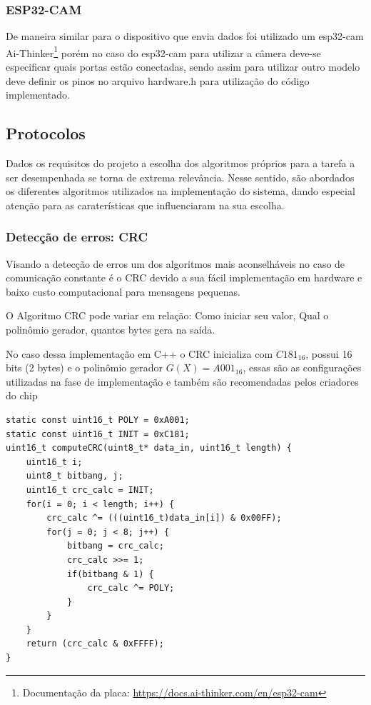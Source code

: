 \documentclass[
article,			%
12pt,				%
oneside,			%
a4paper,			%
english,			%
brazil,				%
sumario=tradicional
]{abntex2}
\begin{document}
\subsubsection{ESP32-CAM}\label{ESP32-CAM}
De maneira similar para o dispositivo que envia dados foi utilizado um esp32-cam Ai-Thinker\footnote{Documentação da placa: \url{https://docs.ai-thinker.com/en/esp32-cam}} porém no caso do esp32-cam para utilizar a câmera deve-se especificar quais portas estão conectadas, sendo assim para utilizar outro modelo deve definir os pinos no arquivo hardware.h para utilização do código implementado.

\cleardoublepage
\subsection{Protocolos}\label{Protocolos}

Dados os requisitos do projeto a escolha dos algoritmos próprios para a tarefa a ser desempenhada se torna de extrema relevância. Nesse sentido, são abordados os diferentes algoritmos utilizados na implementação do sistema, dando especial atenção para as caraterísticas que influenciaram na sua escolha.

\subsubsection{Detecção de erros: CRC}\label{CRC}

Visando a detecção de erros um dos algoritmos mais aconselháveis no caso de comunicação constante é o CRC devido a sua fácil implementação em hardware e baixo custo computacional para mensagens pequenas.

O Algoritmo CRC pode variar em relação: Como iniciar seu valor, Qual o polinômio gerador, quantos bytes gera na saída.

No caso dessa implementação em C++ o CRC inicializa com $C181_{16}$, possui 16 bits (2 bytes) e o polinômio gerador $G(X) = A001_{16}$, essas são as configurações utilizadas na fase de implementação e também são recomendadas pelos criadores do chip\cite{lora_radioenge}

\begin{lstlisting}[title=Algoritmo CRC 16 bits]
static const uint16_t POLY = 0xA001;
static const uint16_t INIT = 0xC181;
uint16_t computeCRC(uint8_t* data_in, uint16_t length) {
    uint16_t i;
    uint8_t bitbang, j;
    uint16_t crc_calc = INIT;
    for(i = 0; i < length; i++) {
        crc_calc ^= (((uint16_t)data_in[i]) & 0x00FF);
        for(j = 0; j < 8; j++) {
            bitbang = crc_calc;
            crc_calc >>= 1;
            if(bitbang & 1) {
                crc_calc ^= POLY;
            }
        }
    }
    return (crc_calc & 0xFFFF);
}
\end{lstlisting}
\end{document}
